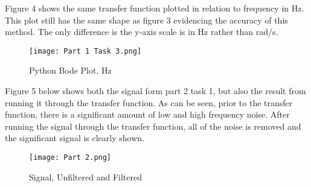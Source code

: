 \documentclass[12pt, titlepage]{article}
\begin{document}
    Figure 4 shows the same transfer function plotted in relation to frequency in Hz.  This plot still has the same shape as figure 3 evidencing the accuracy of this method.  The only difference is the y-axis scale is in Hz rather than rad/s.
    \clearpage
    \begin{figure}[h!]
        \centering
        \texttt{[image: Part 1 Task 3.png]}
        \caption{Python Bode Plot, Hz}
        \label{fig:my_label}
    \end{figure}
    
    Figure 5 below shows both the signal form part 2 task 1, but also the result from running it through the transfer function.  As can be seen, prior to the transfer function, there is a significant amount of low and high frequency noise.  After running the signal through the transfer function, all of the noise is removed and the significant signal is clearly shown.
    
    \begin{figure}
        \centering
        \texttt{[image: Part 2.png]}
        \caption{Signal, Unfiltered and Filtered}
        \label{fig:my_label}
    \end{figure}
    
    
    \clearpage
\end{document}
